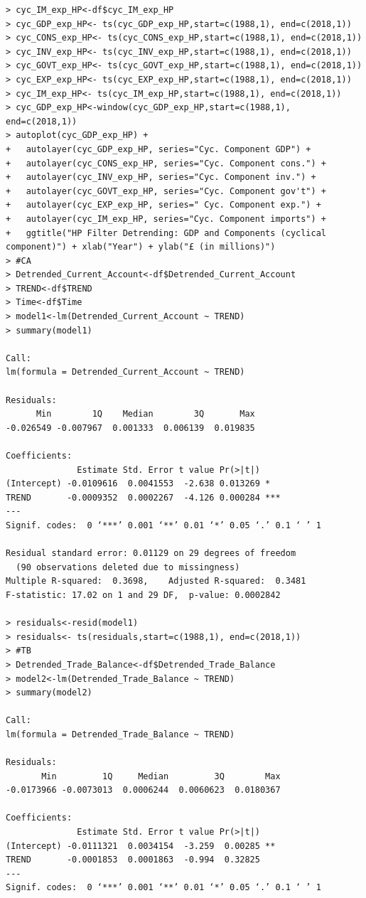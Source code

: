 \documentclass[12pt]{article}
\begin{document}
\begin{verbatim}
> cyc_IM_exp_HP<-df$cyc_IM_exp_HP
> cyc_GDP_exp_HP<- ts(cyc_GDP_exp_HP,start=c(1988,1), end=c(2018,1))
> cyc_CONS_exp_HP<- ts(cyc_CONS_exp_HP,start=c(1988,1), end=c(2018,1))
> cyc_INV_exp_HP<- ts(cyc_INV_exp_HP,start=c(1988,1), end=c(2018,1))
> cyc_GOVT_exp_HP<- ts(cyc_GOVT_exp_HP,start=c(1988,1), end=c(2018,1))
> cyc_EXP_exp_HP<- ts(cyc_EXP_exp_HP,start=c(1988,1), end=c(2018,1))
> cyc_IM_exp_HP<- ts(cyc_IM_exp_HP,start=c(1988,1), end=c(2018,1))
> cyc_GDP_exp_HP<-window(cyc_GDP_exp_HP,start=c(1988,1), end=c(2018,1)) 
> autoplot(cyc_GDP_exp_HP) +
+   autolayer(cyc_GDP_exp_HP, series="Cyc. Component GDP") +
+   autolayer(cyc_CONS_exp_HP, series="Cyc. Component cons.") +
+   autolayer(cyc_INV_exp_HP, series="Cyc. Component inv.") +
+   autolayer(cyc_GOVT_exp_HP, series="Cyc. Component gov't") +
+   autolayer(cyc_EXP_exp_HP, series=" Cyc. Component exp.") +
+   autolayer(cyc_IM_exp_HP, series="Cyc. Component imports") +
+   ggtitle("HP Filter Detrending: GDP and Components (cyclical component)") + xlab("Year") + ylab("£ (in millions)")
> #CA
> Detrended_Current_Account<-df$Detrended_Current_Account
> TREND<-df$TREND
> Time<-df$Time
> model1<-lm(Detrended_Current_Account ~ TREND)
> summary(model1)

Call:
lm(formula = Detrended_Current_Account ~ TREND)

Residuals:
      Min        1Q    Median        3Q       Max 
-0.026549 -0.007967  0.001333  0.006139  0.019835 

Coefficients:
              Estimate Std. Error t value Pr(>|t|)    
(Intercept) -0.0109616  0.0041553  -2.638 0.013269 *  
TREND       -0.0009352  0.0002267  -4.126 0.000284 ***
---
Signif. codes:  0 ‘***’ 0.001 ‘**’ 0.01 ‘*’ 0.05 ‘.’ 0.1 ‘ ’ 1

Residual standard error: 0.01129 on 29 degrees of freedom
  (90 observations deleted due to missingness)
Multiple R-squared:  0.3698,	Adjusted R-squared:  0.3481 
F-statistic: 17.02 on 1 and 29 DF,  p-value: 0.0002842

> residuals<-resid(model1)
> residuals<- ts(residuals,start=c(1988,1), end=c(2018,1))
> #TB
> Detrended_Trade_Balance<-df$Detrended_Trade_Balance
> model2<-lm(Detrended_Trade_Balance ~ TREND)
> summary(model2)

Call:
lm(formula = Detrended_Trade_Balance ~ TREND)

Residuals:
       Min         1Q     Median         3Q        Max 
-0.0173966 -0.0073013  0.0006244  0.0060623  0.0180367 

Coefficients:
              Estimate Std. Error t value Pr(>|t|)   
(Intercept) -0.0111321  0.0034154  -3.259  0.00285 **
TREND       -0.0001853  0.0001863  -0.994  0.32825   
---
Signif. codes:  0 ‘***’ 0.001 ‘**’ 0.01 ‘*’ 0.05 ‘.’ 0.1 ‘ ’ 1


\end{verbatim}
\end{document}
